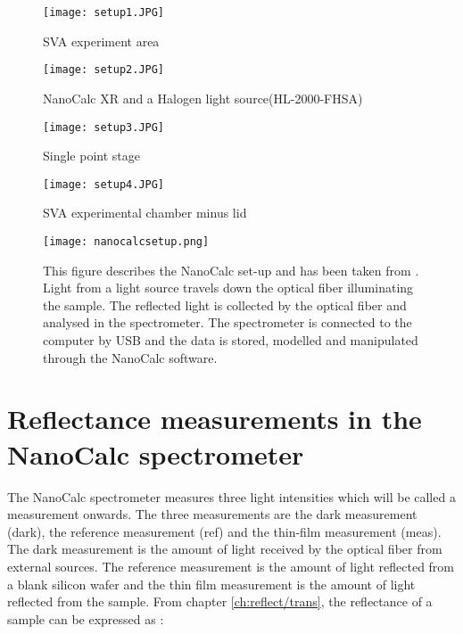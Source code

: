\documentclass[MasterThesisMain.tex]{subfiles}
\begin{document}
	\begin{figure}[ht] 
	  \begin{minipage}[b]{0.5\linewidth}
	    \centering
	    \texttt{[image: setup1.JPG]} 
	    \caption{SVA experiment area}
	    \label{fig:exparea}  
	    \vspace{4ex}
	  \end{minipage}%
	  \begin{minipage}[b]{0.5\linewidth}
	    \centering
	    \texttt{[image: setup2.JPG]} 
	    \caption{NanoCalc XR and a Halogen light source(HL-2000-FHSA)}
	    \label{fig:speclight} 
	    \vspace{4ex}
	  \end{minipage} 
	  \begin{minipage}[b]{0.5\linewidth}
	    \centering
	    \texttt{[image: setup3.JPG]} 
	    \caption{Single point stage} 
	    \label{fig:Singlestage}
	    \vspace{4ex}
	  \end{minipage}%
	  \begin{minipage}[b]{0.5\linewidth}
	    \centering
	    \texttt{[image: setup4.JPG]} 
	    \caption{SVA experimental chamber \break minus lid}
	    \label{fig:SVAchamber} 
	    \vspace{4ex}
	  \end{minipage} 
	\end{figure}
	
	\begin{figure}
	\centering
		\texttt{[image: nanocalcsetup.png]}
		\caption{This figure describes the NanoCalc set-up and has been taken from \cite{nanocalcmanual}. Light from a light source travels down the optical fiber illuminating the sample. The reflected light is collected by the optical fiber and analysed in the spectrometer. The spectrometer is connected to the computer by USB and the data is stored, modelled and manipulated through the NanoCalc software.}
		\label{fig:nanocalcsetup}
	\end{figure}
	
\section{Reflectance measurements in the NanoCalc spectrometer}
The NanoCalc spectrometer measures three light intensities which will be called a measurement onwards. The three measurements are the dark measurement (dark), the reference measurement (ref) and the thin-film measurement (meas). The dark measurement is the amount of light received by the optical fiber from external sources. The reference measurement is the amount of light reflected from a blank silicon wafer and the thin film measurement is the amount of light reflected from the sample. From chapter \ref{ch:reflect/trans}, the reflectance of a sample can be expressed as :
\end{document}
